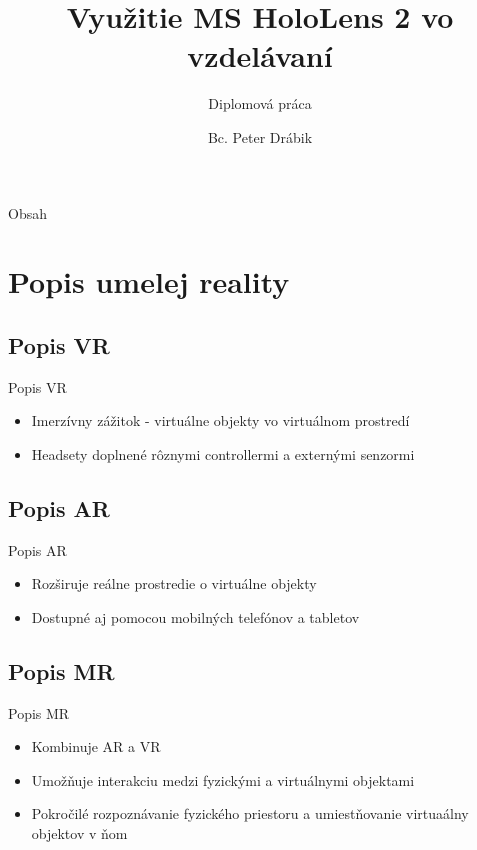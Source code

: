 \documentclass[pdf]{beamer}
\title{Využitie MS HoloLens 2 vo vzdelávaní}
\subtitle{Diplomová práca}
\author{Bc. Peter Drábik}
\begin{document}
\date{}
\begin{frame}
    \titlepage 
\end{frame}

\begin{frame}{Obsah}
    \tableofcontents
\end{frame}


\section{Popis umelej reality}
    

\subsection{Popis VR}
\begin{frame}{Popis VR}
    \begin{itemize}
        \item Imerzívny zážitok - virtuálne objekty vo virtuálnom prostredí
        \item Headsety doplnené rôznymi controllermi a externými senzormi
    \end{itemize}
\end{frame}

\subsection{Popis AR}
\begin{frame}{Popis AR}
    \begin{itemize}
        \item Rozširuje reálne prostredie o virtuálne objekty
        \item Dostupné aj pomocou mobilných telefónov a tabletov
    \end{itemize}
\end{frame}

\subsection{Popis MR}
\begin{frame}{Popis MR}
    \begin{itemize}
        \item Kombinuje AR a VR
        \item Umožňuje interakciu medzi fyzickými a virtuálnymi objektami
        \item Pokročilé rozpoznávanie fyzického priestoru a umiestňovanie virtuaálny objektov v ňom
    \end{itemize}
\end{frame}
\end{document}
